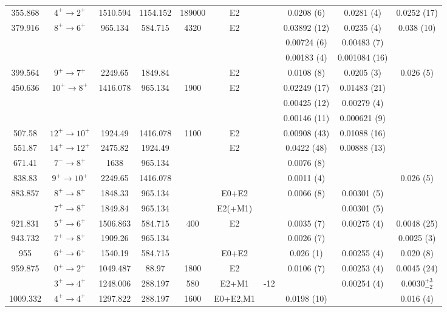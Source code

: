 \begin{landscape}
\begin{longtable}{c|c|c|c|c|c|c|c|c|c}
355.868	&	$4^+	\rightarrow	2^+$	&	1510.594	&	1154.152	&	189000	&	E2	&		&	0.0208 (6)	&	0.0281 (4)	&	0.0252 (17)	\\
379.916	&	$8^+	\rightarrow	6^+$	&	965.134	&	584.715	&	4320	&	E2	&		&	0.03892 (12)	&	0.0235 (4)	&	0.038 (10)	\\
	&				&		&		&		&		&		&	0.00724 (6)	&	0.00483 (7)	&		\\
	&				&		&		&		&		&		&	0.00183 (4)	&	0.001084 (16)	&		\\
399.564	&	$9^+	\rightarrow	7^+$	&	2249.65	&	1849.84	&		&	E2	&		&	0.0108 (8)	&	0.0205 (3)	&	0.026 (5)	\\
450.636	&	$10^+	\rightarrow	8^+$	&	1416.078	&	965.134	&	1900	&	E2	&		&	0.02249 (17)	&	0.01483 (21)	&		\\
	&				&		&		&		&		&		&	0.00425 (12)	&	0.00279 (4)	&		\\
	&				&		&		&		&		&		&	0.00146 (11)	&	0.000621 (9)	&		\\
507.58	&	$12^+	\rightarrow	10^+$	&	1924.49	&	1416.078	&	1100	&	E2	&		&	0.00908 (43)	&	0.01088 (16)	&		\\
551.87	&	$14^+	\rightarrow	12^+$	&	2475.82	&	1924.49	&		&	E2	&		&	0.0422 (48)	&	0.00888 (13)	&		\\
671.41	&	$7^-	\rightarrow	8^+$	&	1638	&	965.134	&		&		&		&	0.0076 (8)	&		&		\\
838.83	&	$9^+	\rightarrow	10^+$	&	2249.65	&	1416.078	&		&		&		&	0.0011 (4)	&		&	0.026 (5)	\\
883.857	&	$8^+	\rightarrow	8^+$	&	1848.33	&	965.134	&		&	E0+E2	&		&	0.0066 (8)	&	0.00301 (5)	&		\\
	&	$7^+	\rightarrow	8^+$	&	1849.84	&	965.134	&		&	E2(+M1)	&		&		&	0.00301 (5)	&		\\
921.831	&	$5^+	\rightarrow	6^+$	&	1506.863	&	584.715	&	400	&	E2	&		&	0.0035 (7)	&	0.00275 (4)	&	0.0048 (25)	\\
943.732	&	$7^+	\rightarrow	8^+$	&	1909.26	&	965.134	&		&		&		&	0.0026 (7)	&		&	0.0025 (3)	\\
955	&	$6^+	\rightarrow	6^+$	&	1540.19	&	584.715	&		&	E0+E2	&		&	0.026 (1)	&	0.00255 (4)	&	0.020 (8)	\\
959.875	&	$0^+	\rightarrow	2^+$	&	1049.487	&	88.97	&	1800	&	E2	&		&	0.0106 (7)	&	0.00253 (4)	&	0.0045 (24)	\\
	&	$3^+	\rightarrow	4^+$	&	1248.006	&	288.197	&	580	&	E2+M1	&	-12	&		&	0.00254 (4)	&	$0.0030_{-2}^{+3}$	\\
1009.332	&	$4^+	\rightarrow	4^+$	&	1297.822	&	288.197	&	1600	&	E0+E2,M1	&		&	0.0198 (10)	&		&	0.016 (4)	\\

\end{longtable}
\end{landscape}
